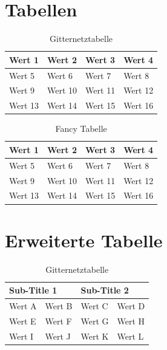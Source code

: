 \documentclass{scrreprt}
\begin{document}
		\section{Tabellen}
			\label{se:tabellen}

			\begin{table}[htbp]
				\caption{Gitternetztabelle}
				\label{tab:gitternetztabelle}
				\label { Tabelle 1.0}
				\centering
				\begin{tabular}{|l|l|l|l|}
					\hline
					Wert 1 & Wert 2 & Wert 3 & Wert 4 \\ \hline
					Wert 5 & Wert 6 & Wert 7 & Wert 8 \\ \hline
					Wert 9 & Wert 10 & Wert 11 & Wert 12  \\ \hline
					Wert 13 & Wert 14 & Wert 15 & Wert 16  \\ \hline
				\end{tabular}
				
			\end{table}
			
			\begin{table}[h!]
				\centering
				\caption{Fancy Tabelle}
				\label{tab:fancytabelle}
			
				\begin{tabular}{llll}
					Wert 1  & Wert 2   & Wert 3  & Wert 4  \\ \hline
					Wert 5  &  Wert 6  & Wert 7  & Wert 8  \\ \hline
					Wert 9  &  Wert 10 & Wert 11 & Wert 12 \\ \hline
					Wert 13 & Wert 14  & Wert 15  & Wert 16 \\ \hline
				\end{tabular}
			\end{table}



		\section{Erweiterte Tabelle}
		\label{se:erwtabelle}

		\begin{table}[htbp]
			\caption{Gitternetztabelle}
			\label{tab:multigitternetz}
			\label { Tabelle 1.0}
			\centering
			\begin{tabular}{|l|l|l|l|}
				\hline
				\multicolumn{2}{|l|}{Sub-Title 1} & \multicolumn{2}{l|}{Sub-Title 2} \\ \hline
				Wert A          & Wert B          & Wert C          & Wert D         \\ \hline
				Wert E          & Wert F          & Wert G          & Wert H         \\ \hline
				Wert I          & Wert J          & Wert K          & Wert L         \\ \hline
			\end{tabular}
		\end{table}
		
\end{document}
